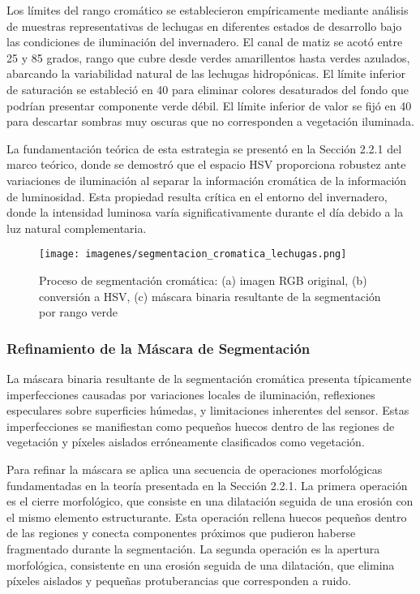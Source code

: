 Los límites del rango cromático se establecieron empíricamente mediante análisis de muestras representativas de lechugas en diferentes estados de desarrollo bajo las condiciones de iluminación del invernadero. El canal de matiz se acotó entre 25 y 85 grados, rango que cubre desde verdes amarillentos hasta verdes azulados, abarcando la variabilidad natural de las lechugas hidropónicas. El límite inferior de saturación se estableció en 40 para eliminar colores desaturados del fondo que podrían presentar componente verde débil. El límite inferior de valor se fijó en 40 para descartar sombras muy oscuras que no corresponden a vegetación iluminada.

La fundamentación teórica de esta estrategia se presentó en la Sección 2.2.1 del marco teórico, donde se demostró que el espacio HSV proporciona robustez ante variaciones de iluminación al separar la información cromática de la información de luminosidad. Esta propiedad resulta crítica en el entorno del invernadero, donde la intensidad luminosa varía significativamente durante el día debido a la luz natural complementaria.

\begin{figure}[h]
\centering
\texttt{[image: imagenes/segmentacion\_cromatica\_lechugas.png]}
\caption{Proceso de segmentación cromática: (a) imagen RGB original, (b) conversión a HSV, (c) máscara binaria resultante de la segmentación por rango verde}
\label{fig:segmentacion_cromatica}
\end{figure}

\subsubsection{Refinamiento de la Máscara de Segmentación}

La máscara binaria resultante de la segmentación cromática presenta típicamente imperfecciones causadas por variaciones locales de iluminación, reflexiones especulares sobre superficies húmedas, y limitaciones inherentes del sensor. Estas imperfecciones se manifiestan como pequeños huecos dentro de las regiones de vegetación y píxeles aislados erróneamente clasificados como vegetación.

Para refinar la máscara se aplica una secuencia de operaciones morfológicas fundamentadas en la teoría presentada en la Sección 2.2.1. La primera operación es el cierre morfológico, que consiste en una dilatación seguida de una erosión con el mismo elemento estructurante. Esta operación rellena huecos pequeños dentro de las regiones y conecta componentes próximos que pudieron haberse fragmentado durante la segmentación. La segunda operación es la apertura morfológica, consistente en una erosión seguida de una dilatación, que elimina píxeles aislados y pequeñas protuberancias que corresponden a ruido.

